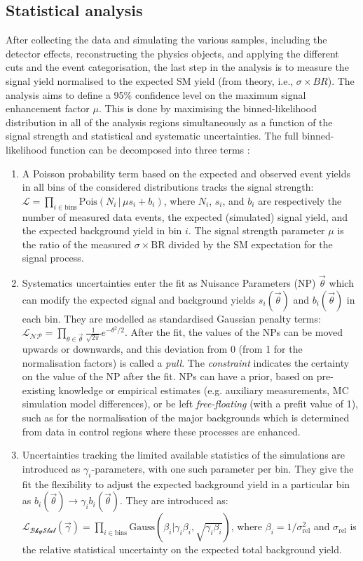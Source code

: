 \subsection{Statistical analysis}
After collecting the data and simulating the various samples, including the detector effects, reconstructing the physics objects, and applying the different cuts and the event categorisation, the last step in the analysis is to measure the signal yield normalised to the expected SM yield (from theory, i.e., $\sigma \times BR$). The analysis aims to define a 95\% confidence level on the maximum signal enhancement factor $\mu$. This is done by maximising the binned-likelihood distribution in all of the analysis regions simultaneously as a function of the signal strength and statistical and systematic uncertainties. The full binned-likelihood function can be decomposed into three terms \cite{Mironova:2837159}: 
\begin{enumerate}
\item A Poisson probability term based on the expected and observed event yields in all bins of the considered distributions tracks the signal strength: $\mathcal{L} = \prod_{i\in \textrm{bins}} \textrm{Pois}(N_i \,|\, \mu s_i + b_i)$, where $N_i$, $s_i$, and $b_i$ are respectively the number of measured data events, the expected (simulated) signal yield, and the expected background yield in bin $i$. The signal strength parameter $\mu$ is the ratio of the measured $\sigma \times \textrm{BR}$ divided by the SM expectation for the signal process.  
\item Systematics uncertainties enter the fit as Nuisance Parameters (NP) $\overrightarrow{\theta}$ which can modify the expected signal and background yields $s_i(\overrightarrow{\theta})$ and $b_i(\overrightarrow{\theta})$ in each bin. They are modelled as standardised Gaussian penalty terms: $\mathcal{L_{\textrm{NP}}} = \prod_{\theta \in \overrightarrow{\theta}} \frac{1}{\sqrt{2\pi}} e^{- \theta^2/2}$. After the fit, the values of the NPs can be moved upwards or downwards, and this deviation from 0 (from 1 for the normalisation factors) is called a \textit{pull}. The \textit{constraint} indicates the certainty on the value of the NP after the fit. NPs can have a prior, based on pre-existing knowledge or empirical estimates (e.g. auxiliary measurements, MC simulation model differences), or be left \textit{free-floating} (with a prefit value of 1), such as for the normalisation of the major backgrounds which is determined from data in control regions where these processes are enhanced. 
\item Uncertainties tracking the limited available statistics of the simulations are introduced as $\gamma_i$-parameters, with one such parameter per bin. They give the fit the flexibility to adjust the expected background yield in a particular bin as $b_i(\overrightarrow{\theta}) \rightarrow \gamma_i b_i(\overrightarrow{\theta})$. They are introduced as: $\mathcal{L_{\textrm{BkgStat}}}(\overrightarrow{\gamma}) = \prod_{i \in \textrm{bins}} \textrm{Gauss}(\beta_i | \gamma_i \beta_i, \sqrt{\gamma_i \beta_i})$, where $\beta_i = 1 / \sigma^2_\textrm{rel}$ and $\sigma_\textrm{rel}$ is the relative statistical uncertainty on the expected total background yield. 
\end{enumerate} 
